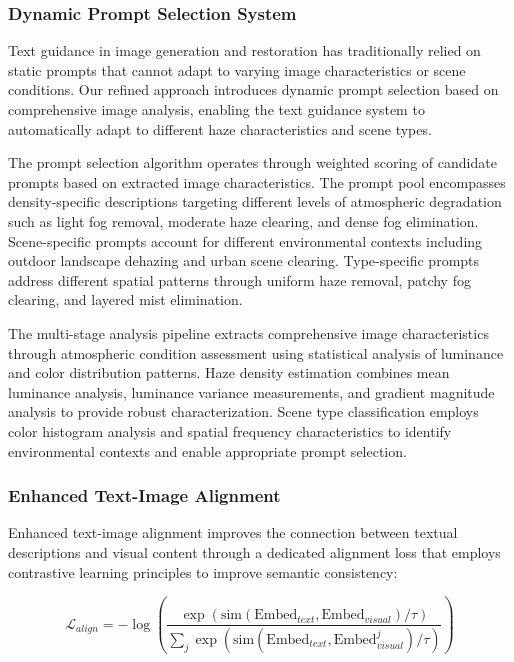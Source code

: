 \documentclass{article}
\begin{document}
\subsubsection{Dynamic Prompt Selection System}

Text guidance in image generation and restoration has traditionally relied on static prompts that cannot adapt to varying image characteristics or scene conditions. Our refined approach introduces dynamic prompt selection based on comprehensive image analysis, enabling the text guidance system to automatically adapt to different haze characteristics and scene types.

The prompt selection algorithm operates through weighted scoring of candidate prompts based on extracted image characteristics. The prompt pool encompasses density-specific descriptions targeting different levels of atmospheric degradation such as light fog removal, moderate haze clearing, and dense fog elimination. Scene-specific prompts account for different environmental contexts including outdoor landscape dehazing and urban scene clearing. Type-specific prompts address different spatial patterns through uniform haze removal, patchy fog clearing, and layered mist elimination.

The multi-stage analysis pipeline extracts comprehensive image characteristics through atmospheric condition assessment using statistical analysis of luminance and color distribution patterns. Haze density estimation combines mean luminance analysis, luminance variance measurements, and gradient magnitude analysis to provide robust characterization. Scene type classification employs color histogram analysis and spatial frequency characteristics to identify environmental contexts and enable appropriate prompt selection.

\subsubsection{Enhanced Text-Image Alignment}

Enhanced text-image alignment improves the connection between textual descriptions and visual content through a dedicated alignment loss that employs contrastive learning principles to improve semantic consistency:

\begin{equation}
\mathcal{L}_{align} = -\log\left(\frac{\exp(\text{sim}(\text{Embed}_{text}, \text{Embed}_{visual})/\tau)}{\sum_{j} \exp(\text{sim}(\text{Embed}_{text}, \text{Embed}_{visual}^j)/\tau)}\right)
\end{equation}
\end{document}

